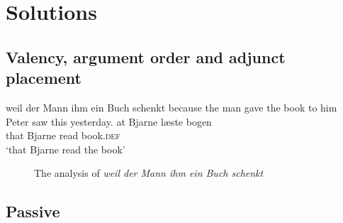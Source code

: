 \chapter{Solutions}


\section{Valency, argument order and adjunct placement}

\eal
\ex weil der Mann ihm ein Buch schenkt
\ex because the man gave the book to him
\ex Peter saw this yesterday.
\ex
\gll at Bjarne læste bogen\\
     that Bjarne read book.\textsc{def}\\
\glt `that Bjarne read the book'
\zl

\begin{figure}
\caption{\label{fig-spr-german}The analysis of \emph{weil der Mann ihm ein Buch schenkt}}
\end{figure}



\section{Passive}

